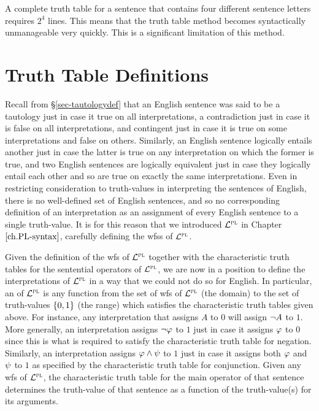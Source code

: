 A complete truth table for a sentence that contains four different sentence letters requires $2^4$ lines.
This means that the truth table method becomes syntactically unmanageable very quickly.
This is a significant limitation of this method.





\section{Truth Table Definitions}
\label{sec.usingtruthtables}

Recall from \S\ref{sec-tautologydef} that an English sentence was said to be a tautology just in case it true on all interpretations, a contradiction just in case it is false on all interpretations, and contingent just in case it is true on some interpretations and false on others.
Similarly, an English sentence logically entails another just in case the latter is true on any interpretation on which the former is true, and two English sentences are logically equivalent just in case they logically entail each other and so are true on exactly the same interpretations.
Even in restricting consideration to truth-values in interpreting the sentences of English, there is no well-defined set of English sentences, and so no corresponding definition of an interpretation as an assignment of every English sentence to a single truth-value.
It is for this reason that we introduced $\mathcal{L}^{\textsc{pl}}$ in Chapter $\ref{ch.PL-syntax}$, carefully defining the wfss of $\mathcal{L}^{\textsc{pl}}$.

Given the definition of the wfs of $\mathcal{L}^{\textsc{pl}}$ together with the characteristic truth tables for the sentential operators of $\mathcal{L}^{\textsc{pl}}$, we are now in a position to define the interpretations of $\mathcal{L}^{\textsc{pl}}$ in a way that we could not do so for English.
In particular, an  of $\mathcal{L}^{\textsc{pl}}$ is any function from the set of wfs of $\mathcal{L}^{\textsc{pl}}$ (the domain) to the set of truth-values $\lbrace0,1\rbrace$ (the range) which satisfies the characteristic truth tables given above.
For instance, any interpretation that assigns $A$ to $0$ will assign $\neg A$ to $1$. 
More generally, an interpretation assigns $\neg \varphi$ to $1$ just in case it assigns $\varphi$ to $0$ since this is what is required to satisfy the characteristic truth table for negation. 
Similarly, an interpretation assigns $\varphi \wedge \psi$ to $1$ just in case it assigns both $\varphi$ and $\psi$ to $1$ as specified by the characteristic truth table for conjunction. 
Given any wfs of $\mathcal{L}^{\textsc{pl}}$, the characteristic truth table for the main operator of that sentence determines the truth-value of that sentence as a function of the truth-value(s) for its arguments.

